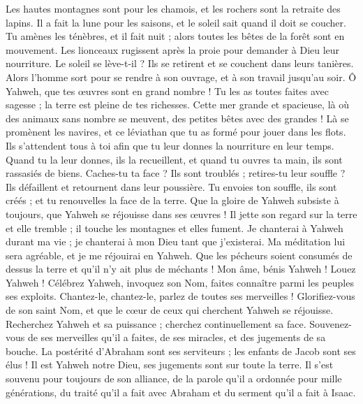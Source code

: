 \begin{multicols}{2}
Les hautes montagnes sont pour les chamois, et les rochers sont la retraite des lapins.
Il a fait la lune pour les saisons, et le soleil sait quand il doit se coucher.
Tu amènes les ténèbres, et il fait nuit ; alors toutes les bêtes de la forêt sont en mouvement.
Les lionceaux rugissent après la proie pour demander à Dieu leur nourriture.
Le soleil se lève-t-il ? Ils se retirent et se couchent dans leurs tanières.
Alors l'homme sort pour se rendre à son ouvrage, et à son travail jusqu'au soir.
Ô Yahweh, que tes œuvres sont en grand nombre ! Tu les as toutes faites avec sagesse ; la terre est pleine de tes richesses.
Cette mer grande et spacieuse, là où des animaux sans nombre se meuvent, des petites bêtes avec des grandes !
Là se promènent les navires, et ce léviathan que tu as formé pour jouer dans les flots.
Ils s'attendent tous à toi afin que tu leur donnes la nourriture en leur temps.
Quand tu la leur donnes, ils la recueillent, et quand tu ouvres ta main, ils sont rassasiés de biens.
Caches-tu ta face ? Ils sont troublés ; retires-tu leur souffle ? Ils défaillent et retournent dans leur poussière.
Tu envoies ton souffle, ils sont créés ; et tu renouvelles la face de la terre.
Que la gloire de Yahweh subsiste à toujours, que Yahweh se réjouisse dans ses œuvres !
Il jette son regard sur la terre et elle tremble ; il touche les montagnes et elles fument.
Je chanterai à Yahweh durant ma vie ; je chanterai à mon Dieu tant que j'existerai.
Ma méditation lui sera agréable, et je me réjouirai en Yahweh.
Que les pécheurs soient consumés de dessus la terre et qu'il n'y ait plus de méchants ! Mon âme, bénis Yahweh ! Louez Yahweh !
\VerseOne{}Célébrez Yahweh, invoquez son Nom, faites connaître parmi les peuples ses exploits.
Chantez-le, chantez-le, parlez de toutes ses merveilles !
Glorifiez-vous de son saint Nom, et que le cœur de ceux qui cherchent Yahweh se réjouisse.
Recherchez Yahweh et sa puissance ; cherchez continuellement sa face.
Souvenez-vous de ses merveilles qu'il a faites, de ses miracles, et des jugements de sa bouche.
La postérité d'Abraham sont ses serviteurs ; les enfants de Jacob sont ses élus !
Il est Yahweh notre Dieu, ses jugements sont sur toute la terre.
Il s'est souvenu pour toujours de son alliance, de la parole qu'il a ordonnée pour mille générations,
du traité qu'il a fait avec Abraham et du serment qu'il a fait à Isaac.

\end{multicols}
